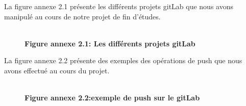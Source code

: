 La figure annexe 2.1 présente les différents projets gitLab que nous avons manipulé au cours de notre projet de fin d'études.
\begin{figure}[htpb]
    \centering
    {\\\textbf{Figure annexe 2.1: Les différents projets gitLab} }
\end{figure}
\newpage
La figure annexe 2.2 présente des exemples des  opérations de push que nous avons effectué au cours du projet.
\begin{figure}[htpb]
    \centering
    {\\\textbf{Figure annexe 2.2:exemple de push sur le gitLab} }
\end{figure}




